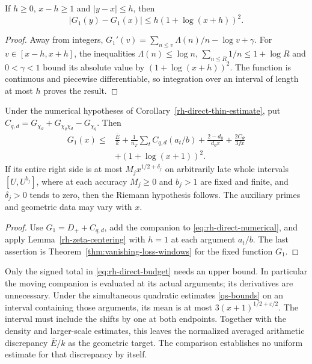 \begin{lemma}\label{rh-zeta-centering}
If $h\ge0$, $x-h\ge1$ and $|y-x|\le h$, then
\[
 |G_1(y)-G_1(x)|\le h(1+\log(x+h))^2.
\]
\end{lemma}
\begin{proof}
Away from integers,
$G_1'(v)=\sum_{n\le v}\Lambda(n)/n-\log v+\gamma$.
For $v\in[x-h,x+h]$, the inequalities
$\Lambda(n)\le\log n$,
$\sum_{n\le R}1/n\le1+\log R$ and $0<\gamma<1$
bound its absolute value by $(1+\log(x+h))^2$.
The function is continuous and piecewise differentiable, so integration
over an interval of length at most $h$ proves the result.
\end{proof}

\begin{corollary}
\label{rh-direct-budget}
Under the numerical hypotheses of Corollary~\ref{rh-direct-thin-estimate},
put $C_{q,d}=G_{\chi_d}+G_{\chi_q\chi_d}-G_{\chi_q}$. Then
\begin{equation}\label{eq:rh-direct-budget}
 \begin{split}
 G_1(x)\le{}&\frac{\overline E}{k}
       +\frac1{n_T}\sum_tC_{q,d}(a_t/b)
       +\frac{2-d_0}{d_0x}+\frac{2C_\Psi}{3fx}\\
       &+(1+\log(x+1))^2.
 \end{split}
\end{equation}
If its entire right side is at most $M_jx^{1/2+\delta_j}$ on
arbitrarily late whole intervals $[U,U^{b_j}]$, where at each
accuracy $M_j\ge0$ and $b_j>1$ are fixed and finite, and
$\delta_j>0$ tends to zero, then the Riemann hypothesis follows.
The auxiliary primes and geometric data may vary with $x$.
\end{corollary}
\begin{proof}
Use $G_1=D_++C_{q,d}$, add the companion to
\eqref{eq:rh-direct-numerical}, and apply
Lemma~\ref{rh-zeta-centering} with $h=1$ at each argument $a_t/b$.
The last assertion is Theorem~\ref{thm:vanishing-loss-windows}
for the fixed function $G_1$.
\end{proof}

Only the signed total in \eqref{eq:rh-direct-budget} needs an upper
bound. In particular the moving companion is evaluated at its actual
arguments; its derivatives are unnecessary. Under the simultaneous
quadratic estimates \eqref{qs-bounds} on an interval containing those
arguments, its mean is at most $3(x+1)^{1/2+\varepsilon/2}$.
The interval must include the shifts by one at both endpoints.
Together with the density and larger-scale estimates, this leaves
the normalized averaged arithmetic discrepancy $\overline E/k$
as the geometric target. The comparison establishes no uniform
estimate for that discrepancy by itself.

